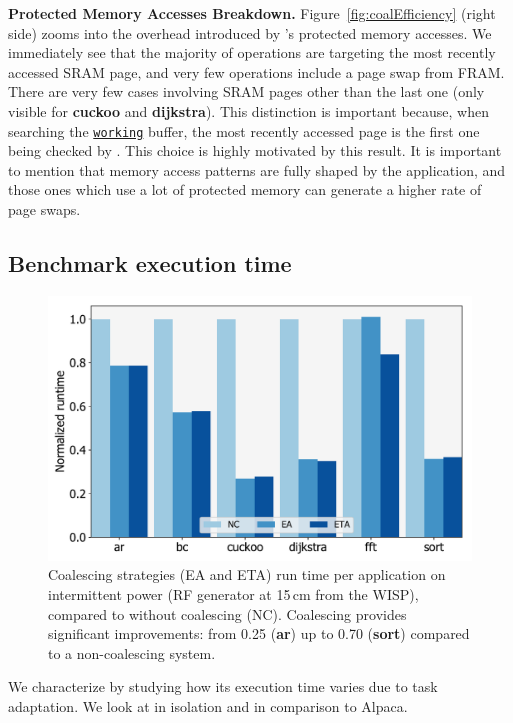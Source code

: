 \textbf{Protected Memory Accesses Breakdown.} Figure~\ref{fig:coalEfficiency} (right side) zooms into the overhead introduced by \sys's protected memory accesses.
We immediately see that the majority of operations are targeting the most recently accessed SRAM page, and very few operations include a page swap from FRAM. There are very few cases involving SRAM pages other than the last one (only visible for \textbf{cuckoo} and \textbf{dijkstra}). This distinction is important because, when searching the \texttt{\underline{working}} buffer, the most recently accessed page is the first one being checked by \sys. This choice is highly motivated by this result. It is important to mention that memory access patterns are fully shaped by the application, and those ones which use a lot of protected memory can generate a higher rate of page swaps.

\subsection{Benchmark execution time}
\label{sec:result_coalescing}

\begin{figure}
	\centering
	\includegraphics[width=0.5\columnwidth]{figures/coalStrategies}
	\caption{Coalescing strategies (EA and ETA) run time per application on intermittent power (RF generator at 15\,cm from the WISP), compared to \sys without coalescing (NC). Coalescing provides significant improvements: from 0.25 (\textbf{ar}) up to 0.70 (\textbf{sort}) compared to a non-coalescing system.}
	\label{fig:coalescing}
\end{figure}

We characterize \sys by studying how its execution time varies due to task adaptation. We look at \sys in isolation and in comparison to Alpaca.


